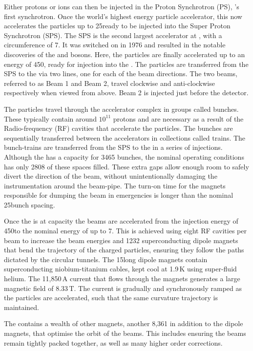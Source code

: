 Either protons or ions can then be injected in the Proton Synchrotron (PS), \cern's first synchrotron. Once the world's highest energy particle accelerator, this now accelerates the particles up to 25\gev ready to be injected into the Super Proton Synchrotron (SPS).
The SPS is the second largest accelerator at \cern, with a circumference of 7\km. It was switched on in 1976 and resulted in the notable discoveries of the \W and \Z bosons. Here, the particles are finally accelerated up to an energy of 450\gev, ready for injection into the \lhc. The particles are transferred from the SPS to the \lhc via two lines, one for each of the \lhc beam directions. The two beams, referred to as Beam 1 and Beam 2, travel clockwise and anti-clockwise respectively when viewed from above. Beam 2 is injected just before the \lhcb detector. 

The particles travel through the accelerator complex in groups called bunches. These typically contain around $10^{11}$ protons and are necessary as a result of the Radio-frequency (RF) cavities that accelerate the particles. The bunches are sequentially transferred between the accelerators in collections called trains. The bunch-trains are transferred from the SPS to the \lhc in a series of injections. Although the \lhc has a capacity for 3465 bunches, the nominal operating conditions has only 2808 of these spaces filled. 
These extra gaps allow enough room to safely divert the direction of the beam, without unintentionally damaging the instrumentation around the beam-pipe. The turn-on time for the magnets responsible for dumping the beam in emergencies is longer than the nominal 25\ns bunch spacing. 


Once the \lhc is at capacity the beams are accelerated from the injection energy of 450\gev to the nominal energy of up to 7\tev. This is achieved using eight RF cavities per beam to increase the beam energies and 1232 superconducting dipole magnets that bend the trajectory of the charged particles, ensuring they follow the paths dictated by the circular tunnels. The 15\m long dipole magnets contain superconducting niobium-titanium cables, kept cool at 1.9\,K using super-fluid helium. The 11,850\,A current that flows through the magnets generates a large magnetic field of 8.33\,T. The current is gradually and synchronously ramped as the particles are accelerated, such that the same curvature trajectory is maintained. 

The \lhc contains a wealth of other magnets, another 8,361 in addition to the dipole magnets, that optimise the orbit of the beams. This includes ensuring the beams remain tightly packed together, as well as many higher order corrections.   

